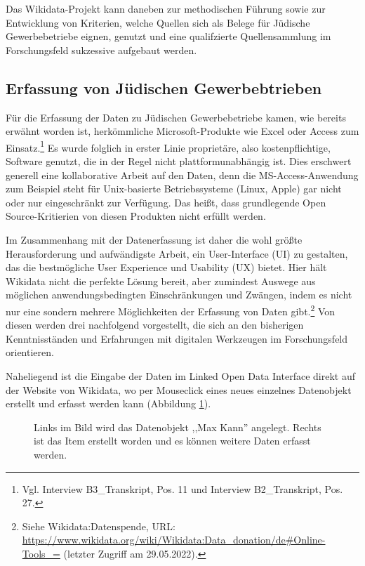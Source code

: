 Das Wikidata-Projekt kann daneben zur methodischen Führung sowie zur Entwicklung von Kriterien, welche Quellen sich als Belege für Jüdische Gewerbebetriebe eignen, genutzt und eine qualifzierte Quellensammlung im Forschungsfeld sukzessive aufgebaut werden.

\subsection{Erfassung von Jüdischen Gewerbebtrieben}

Für die Erfassung der Daten zu Jüdischen Gewerbebetriebe kamen, wie bereits erwähnt worden ist, herkömmliche Microsoft-Produkte wie Excel oder Access zum Einsatz.\footnote{Vgl. Interview B3\_Transkript, Pos. 11 und Interview B2\_Transkript, Pos. 27.} Es wurde folglich in erster Linie proprietäre, also kostenpflichtige, Software genutzt, die in der Regel nicht plattformunabhängig ist. Dies erschwert generell eine kollaborative Arbeit auf den Daten, denn die MS-Access-Anwendung zum Beispiel steht für Unix-basierte Betriebssysteme (Linux, Apple) gar nicht oder nur eingeschränkt zur Verfügung. Das heißt, dass grundlegende Open Source-Kritierien von diesen Produkten nicht erfüllt werden. 

Im Zusammenhang mit der Datenerfassung ist daher die wohl größte Herausforderung und aufwändigste Arbeit, ein User-Interface (UI) zu gestalten, das die bestmögliche User Experience und Usability (UX) bietet. Hier hält Wikidata nicht die perfekte Lösung bereit, aber zumindest Auswege aus möglichen anwendungsbedingten Einschränkungen und Zwängen, indem es nicht nur eine sondern mehrere Möglichkeiten der Erfassung von Daten gibt.\footnote{Siehe Wikidata:Datenspende, URL: \url{https://www.wikidata.org/wiki/Wikidata:Data\_donation/de\#Online-Tools\_=} (letzter Zugriff am 29.05.2022).} Von diesen werden drei nachfolgend vorgestellt, die sich an den bisherigen Kenntnisständen und Erfahrungen mit digitalen Werkzeugen im Forschungsfeld orientieren. 

Naheliegend ist die Eingabe der Daten im Linked Open Data Interface direkt auf der Website von Wikidata, wo per Mouseclick eines neues einzelnes Datenobjekt erstellt und erfasst werden kann (Abbildung \ref{fig:wikidatainterface}). 

\begin{figure}[h]
    \centering
    \caption{Links im Bild wird das Datenobjekt ,,Max Kann'' angelegt. Rechts ist das Item erstellt worden und es können weitere Daten erfasst werden.}
    \label{fig:wikidatainterface}
\end{figure}

